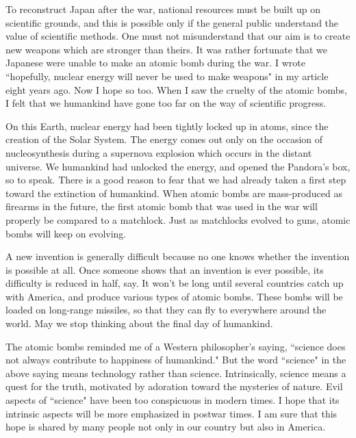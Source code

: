 \documentclass[11pt,a4j,twocolumn]{jarticle}
\begin{document}
To reconstruct Japan after the war, national resources must be built up
on scientific grounds, and this is possible only if
the general public understand the value of scientific methods.
One must not misunderstand that our aim is to create new weapons
which are stronger than theirs.
It was rather fortunate that we Japanese were unable to make an atomic bomb during the war.
I wrote ``hopefully, nuclear energy will never be used to make weapons"
in my article eight years ago. Now I hope so too.
When I saw the cruelty of the atomic bombs, 
I felt that we humankind have gone too far on the way of scientific progress.

On this Earth, nuclear energy had been tightly locked up in atoms,
since the creation of the Solar System.
The energy comes out only on the occasion of nucleosynthesis during a supernova explosion
which occurs in the distant universe.
We humankind had unlocked the energy, and opened the Pandora's box, so to speak.
There is a good reason to fear that we had already taken
a first step toward the extinction of humankind.
When atomic bombs are mass-produced as firearms in the future,
the first atomic bomb that was used in the war will properly be compared to a matchlock.
Just as matchlocks evolved to guns, atomic bombs will keep on evolving.

A new invention is generally difficult because no one knows whether
the invention is possible at all. Once someone shows that an invention is ever possible,
its difficulty is reduced in half, say.
It won't be long until several countries catch up with America,
and produce various types of atomic bombs.
These bombs will be loaded on long-range missiles, 
so that they can fly to everywhere around the world.
May we stop thinking about the final day of humankind.

The atomic bombs reminded me of a Western philosopher's saying,
``science does not always contribute to happiness of humankind."
But the word ``science" in the above saying means technology rather than science.
Intrinsically, science means a quest for the truth, motivated by adoration
toward the mysteries of nature.
Evil aspects of ``science" have been too conspicuous in modern times.
I hope that its intrinsic aspects will be more emphasized in postwar times.
I am sure that this hope is shared by many people not only in our country but also in America.
\end{document}
